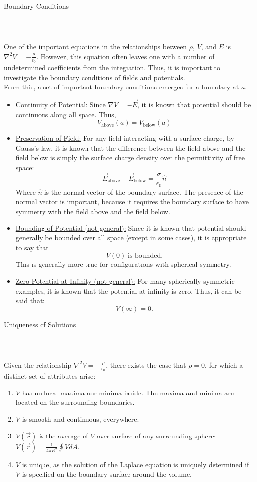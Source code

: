 \documentclass{article}
\newcommand{\header}[1]{\begin{large}\noindent #1\end{large}\\\rule{\textwidth}{0.5pt}}
\newcommand{\gap}{\medskip\\}
\newcommand{\sheader}[1]{\underline{#1:}}
\begin{document}
\header{Boundary Conditions}
One of the important equations in the relationships between $\rho$, $V$, and $E$ is 
$\nabla^2 V = - \frac{\rho}{\epsilon_0}$. However, this equation often leaves one 
with a number of undetermined coefficients from the integration. Thus, it is important
to investigate the boundary conditions of fields and potentials.
\gap
From this, a set of important boundary conditions emerges for a boundary at $a$.
\begin{itemize}
    \item \sheader{Continuity of Potential} Since $\nabla V = -\vec{E}$, it is known 
    that potential should be continuous along all space. Thus,
    \[
        V_\textrm{above}(a) = V_\textrm{below}(a)
    \]
    \item \sheader{Preservation of Field} For any field interacting with a surface charge,
    by Gauss's law, it is known that the difference between the field above and the field
    below is simply the surface charge density over the permittivity of free space:
    \[
        \vec{E}_\textrm{above} - \vec{E}_\textrm{below} = \frac{\sigma}{\epsilon_0}\hat{n}    
    \]
    Where $\hat{n}$ is the normal vector of the boundary surface. The presence of the
    normal vector is important, because it requires the boundary surface to have 
    symmetry with the field above and the field below.
    \item \sheader{Bounding of Potential (not general)} Since it is known that potential should generally 
    be bounded over all space (except in some cases), it is appropriate to say that
    \[
        V(0) \textrm{ is bounded.}    
    \]
    This is generally more true for configurations with spherical symmetry.
    \item \sheader{Zero Potential at Infinity (not general)} For many spherically-symmetric
    examples, it is known that the potential at infinity is zero. Thus, it can be said that:
    \[
        V(\infty) = 0.    
    \]
\end{itemize}
\pagebreak

\header{Uniqueness of Solutions}
Given the relationship $\nabla^2 V = -\frac{\rho}{\epsilon_0}$, there exists the case
that $\rho =0$, for which a distinct set of attributes arise:
\begin{enumerate}
    \item $V$ has no local maxima nor minima inside. The maxima and minima are located
    on the surrounding boundaries.
    \item $V$ is smooth and continuous, everywhere.
    \item $V(\vec{r})$ is the average of $V$ over surface of any surrounding sphere:
    $V(\vec{r}) = \frac{1}{4\pi R^2}\oint VdA$.
    \item $V$ is unique, as the solution of the Laplace equation is uniquely determined
    if $V$ is specified on the boundary surface around the volume.
\end{enumerate}
\end{document}
